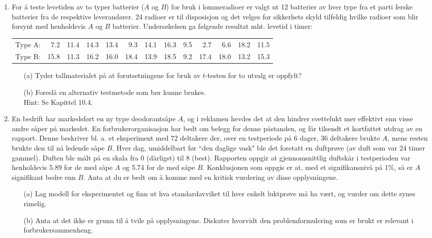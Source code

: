 \begin{enumerate}
\item
For å teste levetiden av to typer batterier ($A$ og $B$) for bruk
i lommeradioer er valgt ut 12 batterier av hver type fra et parti
ferske batterier fra de respektive leverandører.  24 radioer er til
disposisjon og det velges for sikkerhets skyld tilfeldig hvilke radioer
som blir forsynt med henholdsvis $A$ og $B$ batterier.  Undersøkelsen
ga følgende resultat mht. levetid i timer:
\begin{center}\scriptsize \addtolength{\tabcolsep}{-0.3\tabcolsep}
\begin{tabular}{lrrrrrrrrrrrr} 
Type A: & 7.2 & 11.4 & 14.3 & 13.4 & 9.3 & 14.1 & 16.3 & 9.5 & 2.7 & 6.6
        & 18.2 & 11.5 \\
Type B: & 15.8 & 11.3 & 16.2 & 16.0 & 18.4 & 13.9 & 18.5 & 9.2 & 17.4 
        & 18.0 & 13.2 & 15.3
\end{tabular}
\end{center}
\begin{itemize}
\item[(a)] Tyder tallmaterialet på at forutsetningene for bruk av
           $t$-testen for to utvalg er oppfylt?
\item[(b)] Foreslå en alternativ testmetode som bør kunne brukes.\\
           Hint: Se Kapittel 10.4.
\end{itemize}

\item
En bedrift har markedsført en ny type deodorantsåpe $A$, og i
reklamen hevdes det at den hindrer svettelukt mer effektivt enn visse
andre såper på markedet.  En forbrukerorganisasjon har bedt
om belegg for denne påstanden, og får tilsendt et kortfattet 
utdrag av en rapport.  Denne beskriver bl. a. et eksperiment med 
72 deltakere der, over en testperiode på 6 dager, 36 deltakere 
brukte $A$, mens resten brukte den til nå ledende såpe $B$.
Hver dag, umiddelbart før ``den daglige vask" ble det foretatt en
duftprøve (av duft som var 24 timer gammel).  Duften ble målt
på en skala fra 0 (dårligst) til 8 (best).  Rapporten oppgir
at gjennomsnittlig duftskår i testperioden var henholdsvis 5.89 for
de med såpe $A$ og 5.74 for de med såpe $B$.  Konklusjonen som
oppgis er at, med et signifikansnivå på 1\%, så er $A$
signifikant bedre enn $B$.  Anta at du er bedt om å komme med en 
kritisk vurdering av disse opplysningene.  

\begin{itemize}
\item[(a)] Lag modell for eksperimentet og finn ut hva standardavviket
           til hver enkelt luktprøve må ha vært, og vurder om
           dette synes rimelig.
\item[(b)] Anta at det ikke er grunn til å tvile på
           opplysningene.  Diskuter hvorvidt den problemformulering som
           er brukt er relevant i for\-bru\-ker\-sam\-men\-heng.
\end{itemize}


\end{enumerate}
